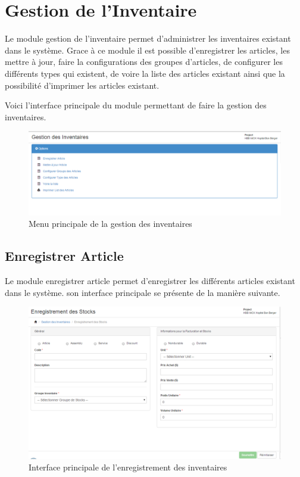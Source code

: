 \documentclass[12pt,a4paper]{report}
\begin{document}
\newpage
\section{Gestion de l'Inventaire}
Le module gestion de l'inventaire permet d'administrer les inventaires existant dans le système. Grace à ce module il est possible d'enregistrer les articles, les mettre à jour, faire la configurations des groupes d'articles, de configurer les différents types qui existent, de voire la liste des articles existant ainsi que la possibilité d'imprimer les articles existant.

Voici l'interface principale du module permettant de faire la gestion des inventaires.

\begin{figure}[h]
\begin{center}
\includegraphics[width=12cm]{pic/GestInventaires.png}
\end{center}
\caption{Menu principale de la gestion des inventaires}
\label{Menu principale de la gestion des inventaires}
\end{figure}

\subsection{Enregistrer Article}
Le module enregistrer article permet d'enregistrer les différents articles existant dans le système. son interface principale se présente de la manière suivante.

\begin{figure}[h]
\begin{center}
\includegraphics[width=12cm]{pic/SaveStock.png}
\end{center}
\caption{Interface principale de l'enregistrement des inventaires}
\label{Interface principale de l'enregistrement des inventaires}
\end{figure}
\end{document}
